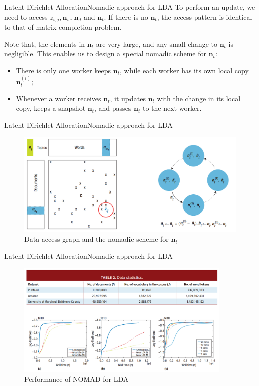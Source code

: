 \documentclass{beamer}
\renewcommand{\vec}{\mathbf}
\begin{document}
  \begin{frame}{Latent Dirichlet Allocation}{Nomadic approach for LDA}
    To perform an update, we need to access $z_{i, j}, \vec{n}_w, \vec{n}_d$ and $\vec{n}_t$. If there is no $\vec{n}_t$, the access pattern is identical to that of matrix completion problem. \par
    \pause
    Note that, the elements in $\vec{n}_t$ are very large, and any small change to $\vec{n}_t$ is negligible. This enables us to design a special nomadic scheme for $\vec{n}_t$:
    \begin{itemize}
      \item There is only one worker keeps $\vec{n}_t$, while each worker has its own local copy $\vec{n}_t^{(i)}$;
      \item Whenever a worker receives $\vec{n}_t$, it updates $\vec{n}_t$ with the change in its local copy, keeps a snapshot $\vec{\bar{n}}_t$, and passes $\vec{n}_t$ to the next worker.
    \end{itemize}
  \end{frame}

  \begin{frame}{Latent Dirichlet Allocation}{Nomadic approach for LDA}
    \begin{figure}
      \includegraphics[height = 5cm]{cgs_data.png}
      \caption{Data access graph and the nomadic scheme for $\vec{n}_t$}
    \end{figure}
  \end{frame}

  \begin{frame}{Latent Dirichlet Allocation}{Nomadic approach for LDA}
    \begin{figure}
      \includegraphics[height = 5.5cm]{cgs_perform.png}
      \caption{Performance of NOMAD for LDA}
    \end{figure}
  \end{frame}
\end{document}
